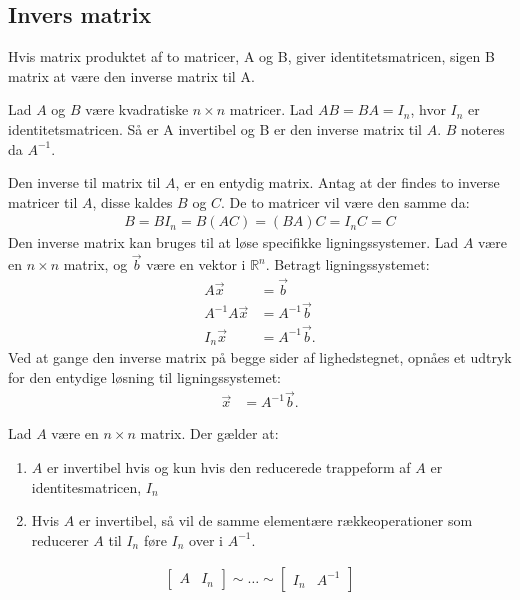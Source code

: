 \subsection{Invers matrix}
Hvis matrix produktet af to matricer, A og B, giver identitetsmatricen, sigen B matrix at være den inverse matrix til A. 
\begin{defn}
Lad $A$ og $B$ være kvadratiske $n \times n$ matricer. Lad $AB=BA=I_n$, hvor $I_n$ er identitetsmatricen. Så er A invertibel og B er den inverse matrix til $A$. $B$ noteres da $A^{-1}$. 
\label{def(inversmatrix)}
\end{defn}
Den inverse til matrix til $A$, er en entydig matrix. Antag at der findes to inverse matricer til $A$, disse kaldes $B$ og $C$. De to matricer vil være den samme da: 
\begin{align*}
B=BI_n=B(AC)=(BA)C=I_nC=C
\end{align*}
Den inverse matrix kan bruges til at løse specifikke ligningssystemer. Lad $A$ være en $n \times n$ matrix, og $\vec{b}$ være en vektor i $\mathds{R}^n$. Betragt ligningssystemet: 
\begin{align*}
A \vec{x} &= \vec{b}\\
A^{-1} A \vec{x} &= A^{-1} \vec{b}\\
I_n \vec{x} &= A^{-1} \vec{b}.
\end{align*} 
Ved at gange den inverse matrix på begge sider af lighedstegnet, opnåes et udtryk for den entydige løsning til ligningssystemet: 
\begin{align}
\vec{x} &= A^{-1} \vec{b}.
\end{align} 

\begin{stn}
Lad $A$ være en $n \times n$ matrix. Der gælder at: 
\begin{enumerate}[label=(\alph*)]
\item $A$ er invertibel hvis og kun hvis den reducerede trappeform af $A$ er identitesmatricen, $I_n$
\item Hvis $A$ er invertibel, så vil de samme elementære rækkeoperationer som reducerer $A$ til $I_n$ føre $I_n$ over i $A^{-1}$.  
\end{enumerate}
\begin{align*}
\begin{bmatrix}
A & I_n
\end{bmatrix} \sim \dots \sim
\begin{bmatrix}
I_n & A^{-1}
\end{bmatrix}
\end{align*}
\label{stn:inversmatrix}
\end{stn}

